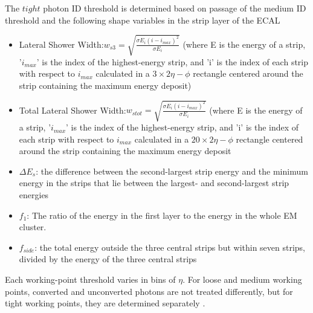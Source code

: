 The $tight$ photon ID threshold is determined based on passage of the medium ID threshold and the following shape variables in the strip layer of the ECAL
\begin{itemize}
  \item Lateral Shower Width:$w_{s3} = \sqrt{\frac{\sigma E_{i}(i-i_{max})^{2}}{\sigma E_{i}}}$ (where E is the energy of a strip, '$i_{max}$' is the index of the highest-energy strip, and 'i' is the index of each strip with respect to $i_{max}$ calculated in a $3 \times 2 \eta-\phi$  rectangle centered around the strip containing the maximum energy deposit)
  \item Total Lateral Shower Width:$w_{s tot} = \sqrt{\frac{\sigma E_{i}(i-i_{max})^{2}}{\sigma E_{i}}}$ (where E is the energy of a strip, '$i_{max}$' is the index of the highest-energy strip, and 'i' is the index of each strip with respect to $i_{max}$ calculated in a $20 \times 2 \eta-\phi$  rectangle centered around the strip containing the maximum energy deposit
  \item $\Delta E_{s}$: the difference between the second-largest strip energy and the minimum energy in the strips that lie between the largest- and second-largest strip energies
  \item $f_{1}$: The ratio of the energy in the first layer to the energy in the whole EM cluster.
  \item $f_{side}$: the total energy outside the three central strips but within seven strips, divided by the energy of the three central strips 
\end{itemize}

Each working-point threshold varies in bins of $\eta$. For loose and medium working points, converted and unconverted photons are not treated differently, but for tight working points, they are determined separately \cite{gammaID}.

